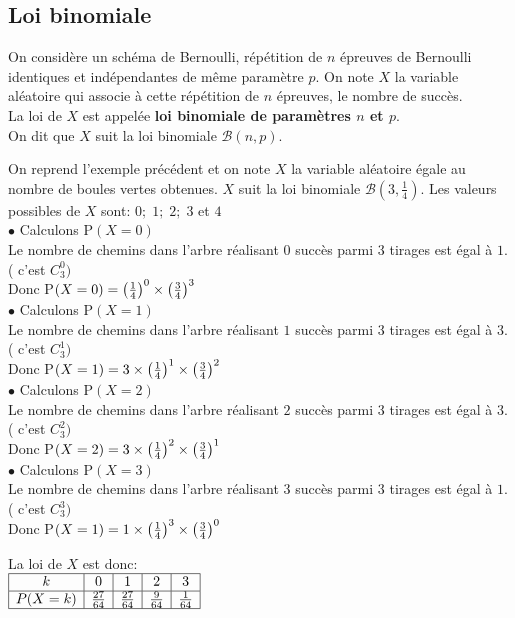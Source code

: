    \subsection{Loi binomiale}
  \begin{definition}
  On considère un schéma de Bernoulli, répétition de $ n $ épreuves de Bernoulli identiques et indépendantes de même paramètre  $ p $.  On note $ X $ la variable aléatoire qui associe à cette répétition de $ n $  épreuves, le nombre de succès.\\La loi de $ X $   est appelée \textbf{loi binomiale de paramètres  $ n$ et $ p$}.\\ On dit que $ X $  suit la loi binomiale $ \mathcal{B}(n, p) $.
    \end{definition}
   
    \begin{example}
On reprend l'exemple précédent et on note $ X $ la variable aléatoire égale au nombre de boules  vertes obtenues. $ X $  suit la loi binomiale $ \mathcal{B}(3,\tfrac{1}{4} ) $. Les valeurs possibles de $ X $  sont: $ 0;\;1;\;2;\;3 $ \; et \;$ 4 $\\
$ \bullet $ Calculons P$ (X=0 )$ \\Le nombre de chemins dans l’arbre réalisant  $ 0 $ succès parmi  $ 3 $ tirages est égal à $ 1. $ \; ( c'est $ C_{3}^{0}) $\\ Donc P$ (X=0 )=\left(\tfrac{1}{4}\right)^{0}\times \left(\tfrac{3}{4}\right)^{3}$\\
$ \bullet $ Calculons P$ (X=1 )$ \\Le nombre de chemins dans l’arbre réalisant  $ 1$ succès parmi  $ 3 $ tirages est égal à $ 3. $\; ( c'est $ C_{3}^{1}) $\\ Donc P$ (X=1 )=3\times\left(\tfrac{1}{4}\right)^{1}\times \left(\tfrac{3}{4}\right)^{2}$\\
$ \bullet $ Calculons P$ (X=2 )$ \\Le nombre de chemins dans l’arbre réalisant  $ 2$ succès parmi  $ 3 $ tirages est égal à $ 3. $\; ( c'est $ C_{3}^{2}) $\\ Donc P$ (X=2 )= 3\times\left(\tfrac{1}{4}\right)^{2}\times \left(\tfrac{3}{4}\right)^{1}$\\
$ \bullet $ Calculons P$ (X=3 )$ \\Le nombre de chemins dans l’arbre réalisant  $ 3$ succès parmi  $ 3 $ tirages est égal à $ 1. $\; ( c'est $ C_{3}^{3}) $\\ Donc P$ (X=1 )= 1\times\left(\tfrac{1}{4}\right)^{3}\times \left(\tfrac{3}{4}\right)^{0}$


La loi de $X$  est donc:\\
 
  

  $ \begin{array}{|c|c|c|c|c|}
\hline
  k  & 0 &1&2&3  \\
 \hline
P(X=k ) &  \frac{27}{64} &  \frac{27}{64}  & \frac{9}{64}  & \frac{1}{64} \\
\hline
\end{array}$
 
    \end{example}
